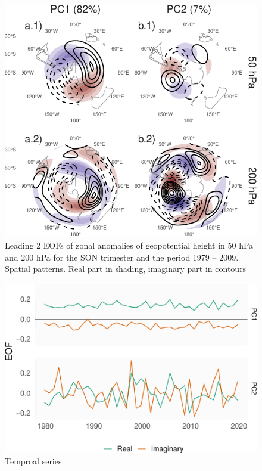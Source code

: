 \documentclass[smallextended]{svjour3}       %
\begin{document}
\begin{figure}
\centering
\includegraphics{../figures/ceofs-1-1.pdf}
\caption{\label{fig:ceofs-1}Leading 2 EOFs of zonal anomalies of geopotential height in 50 hPa and 200 hPa for the SON trimester and the period 1979 -- 2009. Spatial patterns. Real part in shading, imaginary part in contours}
\end{figure}

\begin{figure}
\centering
\includegraphics{../figures/ceofs-2-1.pdf}
\caption{\label{fig:ceofs-2}Temproal series.}
\end{figure}
\end{document}
